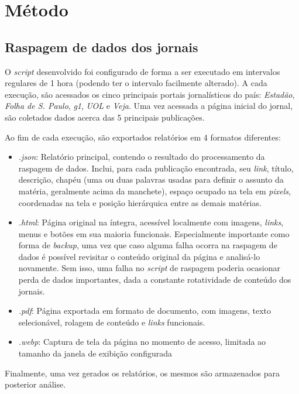 \documentclass[
	12pt,
	oneside,
	a4paper,
	english,
	brazil
]{abntex2ppgsi}
\begin{document}
\chapter{Método}

\section{Raspagem de dados dos jornais}

O \textit{script} desenvolvido foi configurado de forma a ser executado em intervalos regulares de 1 hora (podendo ter o intervalo facilmente alterado). A cada execução, são acessados os cinco principais portais jornalísticos do país: \textit{Estadão}, \textit{Folha de S. Paulo}, \textit{g1}, \textit{UOL} e \textit{Veja}. Uma vez acessada a página inicial do jornal, são coletados dados acerca das 5 principais publicações.

Ao fim de cada execução, são exportados relatórios em 4 formatos diferentes:
\begin{itemize}
    \item \textit{.json}: Relatório principal, contendo o resultado do processamento da raspagem de dados. Inclui, para cada publicação encontrada, seu \textit{link}, título, descrição, chapéu (uma ou duas palavras usadas para definir o assunto da matéria, geralmente acima da manchete), espaço ocupado na tela em \textit{pixels}, coordenadas na tela e posição hierárquica entre as demais matérias.
    \item \textit{.html}: Página original na íntegra, acessível localmente com imagens, \textit{links}, menus e botões em sua maioria funcionais. Especialmente importante como forma de \textit{backup}, uma vez que caso alguma falha ocorra na raspagem de dados é possível revisitar o conteúdo original da página e analisá-lo novamente. Sem isso, uma falha no \textit{script} de raspagem poderia ocasionar perda de dados importantes, dada a constante rotatividade de conteúdo dos jornais.
    \item \textit{.pdf}: Página exportada em formato de documento, com imagens, texto selecionável, rolagem de conteúdo e \textit{links} funcionais.
    \item \textit{.webp}: Captura de tela da página no momento de acesso, limitada ao tamanho da janela de exibição configurada
\end{itemize}

Finalmente, uma vez gerados os relatórios, os mesmos são armazenados para posterior análise.
\end{document}
